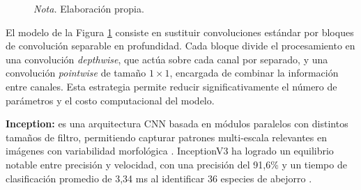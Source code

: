 \begin{figure}[h]
    \label{fig:estructura_mobilenet}

    \vspace{0.2cm}
    \caption*{\normalfont\normalsize\textit{Nota.} Elaboración propia.}
    
\end{figure}

\vspace{-0.5cm}
El modelo de la Figura \ref{fig:estructura_mobilenet} consiste en sustituir convoluciones estándar por bloques de convolución separable en profundidad. Cada bloque divide el procesamiento en una convolución \textit{depthwise}, que actúa sobre cada canal por separado, y una convolución \textit{pointwise} de tamaño \(1\times1\), encargada de combinar la información entre canales. Esta estrategia permite reducir significativamente el número de parámetros y el costo computacional del modelo.

\par\indent\textbullet\hspace{0.2cm} \textbf{Inception:} es una arquitectura CNN basada en módulos paralelos con distintos tamaños de filtro, permitiendo capturar patrones multi-escala relevantes en imágenes con variabilidad morfológica \parencite{Kukkadapu2025,Anumol2023}. InceptionV3 ha logrado un equilibrio notable entre precisión y velocidad, con una precisión del 91,6\% y un tiempo de clasificación promedio de 3,34 ms al identificar 36 especies de abejorro \parencite{spiesman2021bumblebee}. \\

